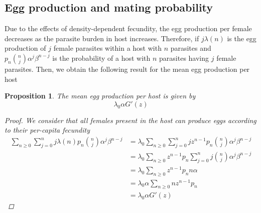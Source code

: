 \documentclass[12pt,a4paper]{article}
\theoremstyle{plain}%
\newtheorem{prop}[thm]{Proposition}
\theoremstyle{definition}
\theoremstyle{remark}
\begin{document}
	\subsection{Egg production and mating probability}
	Due to the effects of density-dependent fecundity, the egg production per female decreases as the parasite burden in host increases.
	Therefore, if $j\lambda(n)$ is the egg production of $j$ female parasites within a host with $n$ parasites
	and $p_n\binom{n}{j}\alpha^j\beta^{n-j}$ is the probability of a host with $n$ parasites having $j$ female parasites.
	Then, we obtain the following result for the mean egg production per host 
%	
	\begin{prop}\label{prodhuevos}
		The mean egg production per host is given by
		\begin{equation}
		\lambda_0\alpha G'(z)
		\end{equation}
		\begin{proof}
			We consider that all females present in the host can produce eggs according to their  per-capita fecundity
			\begin{equation*}
			\begin{split}
			\sum_{n\geq 0}\sum_{j=0}^{n}j\lambda(n)p_n\binom{n}{j}\alpha^j\beta^{n-j}
			&=\lambda_0\sum_{n\geq 0}\sum_{j=0}^{n}jz^{n-1}p_n\binom{n}{j}\alpha^j\beta^{n-j}\\
			&=\lambda_0\sum_{n\geq 0}z^{n-1}p_n\sum_{j=0}^{n} j\binom{n}{j}\alpha^j\beta^{n-j}\\
			&=\lambda_0\sum_{n\geq 0}z^{n-1}p_nn\alpha\\
			&=\lambda_0\alpha  \sum_{n\geq 0}nz^{n-1}p_n \\
			&=\lambda_0\alpha G'(z)
			\end{split}
			\end{equation*}
		\end{proof}
	\end{prop}
	
\end{document}
